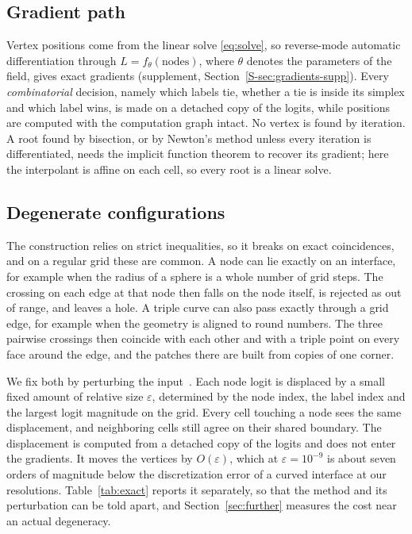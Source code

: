 \documentclass{egpubl}
\newcommand{\sref}[1]{\ref*{S-#1}}
\newcommand{\suppp}[1]{supplement, Section~\sref{#1}}
\theoremstyle{definition}
\begin{document}
\subsection{Gradient path}
\label{sec:gradients}

Vertex positions come from the linear solve \eqref{eq:solve}, so reverse-mode
automatic differentiation through $L = f_\theta(\text{nodes})$, where $\theta$
denotes the parameters of the field, gives exact
gradients (\suppp{sec:gradients-supp}). Every \emph{combinatorial}
decision, namely which labels tie, whether a tie is inside its simplex and
which label wins, is made on a detached copy of the logits, while positions
are computed with the computation graph intact. No vertex is found by
iteration. A root found by bisection, or by Newton's method unless every
iteration is differentiated, needs the implicit function theorem to recover
its gradient; here the interpolant is affine on each cell, so every root is
a linear solve.

\subsection{Degenerate configurations}
\label{sec:degeneracy}

The construction relies on strict inequalities, so it breaks on exact
coincidences, and on a regular grid these are common.
A node can lie exactly on an interface, for example when the radius of
a sphere is a whole number of grid steps. The crossing on each edge at that
node then falls on the node itself, is rejected as out of range, and leaves a
hole. A triple curve can also pass exactly through a grid edge, for example
when the geometry is aligned to round numbers. The three pairwise crossings
then coincide with each other and with a triple point on every face around
the edge, and the patches there are built from copies of one corner.

We fix both by perturbing the input~\cite{edelsbrunner1990}. Each node
logit is displaced by a small fixed amount of relative size $\varepsilon$,
determined by the node index, the label index and the largest logit
magnitude on the grid. Every
cell touching a node sees the same displacement, and neighboring cells still
agree on their shared boundary. The displacement is computed from a
detached copy of the logits and does not enter the gradients. It moves
the vertices by $O(\varepsilon)$, which at
$\varepsilon = 10^{-9}$ is about seven orders of magnitude below the
discretization error of a curved interface at our resolutions. Table~\ref{tab:exact} reports it separately, so that the method and its
perturbation can be told apart, and Section~\ref{sec:further} measures the
cost near an actual degeneracy.
\end{document}

